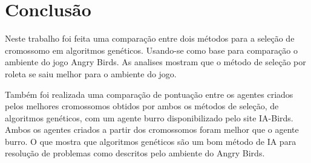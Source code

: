 \documentclass[10pt,a4paper]{article}
\begin{document}
\section{Conclusão}
Neste trabalho foi feita uma comparação entre dois métodos para a seleção de cromossomo em algoritmos genéticos. Usando-se como base para comparação o ambiente do jogo Angry Birds.  As analises mostram que o método de seleção por roleta se saiu melhor para o ambiente do jogo. 

Também foi realizada uma comparação de pontuação entre os agentes criados pelos melhores cromossomos obtidos por ambos os métodos de seleção, de algoritmos genéticos, com um agente burro disponibilizado pelo site IA-Birds. Ambos os agentes criados a partir dos cromossomos foram melhor que o agente burro. O que mostra que algoritmos genéticos são um bom método de IA para resolução de problemas como descritos pelo ambiente do Angry Birds.


\end{document}
